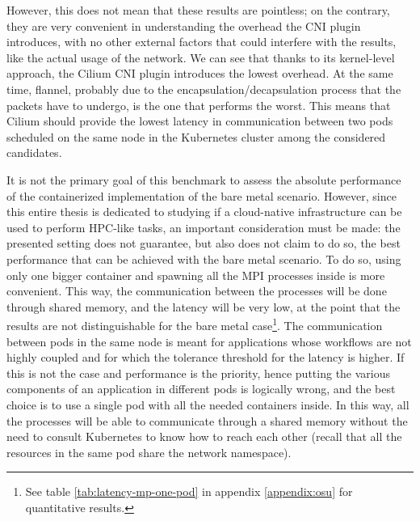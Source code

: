 However, this does not mean that these results are pointless; on the contrary,
they are very convenient in understanding the overhead the CNI plugin
introduces, with no other external factors that could interfere with the
results, like the actual usage of the network.
We can see that thanks to its kernel-level approach, the Cilium CNI plugin
introduces the lowest overhead. At the same time, flannel, probably due to the
encapsulation/decapsulation process that the packets have to undergo, is the one
that performs the worst.
This means that Cilium should provide the lowest latency in communication
between two pods scheduled on the same node in the Kubernetes cluster among the
considered candidates.

It is not the primary goal of this benchmark to assess the absolute performance
of the containerized implementation of the bare metal scenario. However, since
this entire thesis is dedicated to studying if a cloud-native infrastructure can
be used to perform HPC-like tasks, an important consideration must be made: the
presented setting does not guarantee, but also does not claim to do so, the best
performance that can be achieved with the bare metal scenario.
To do so, using only one bigger container and spawning all the MPI processes
inside is more convenient. This way, the communication between the processes
will be done through shared memory, and the latency will be very low, at the
point that the results are not distinguishable for the bare metal
case\footnote{See table
  \ref{tab:latency-mp-one-pod} in appendix \ref{appendix:osu} for
  quantitative results.}.
The communication between pods in the same node is meant for applications whose
workflows are not highly coupled and for which the tolerance threshold for the
latency is higher. If this is not the case and performance is the priority,
hence putting the various components of an application in different pods is
logically wrong, and the best choice is to use a single pod with all the needed
containers inside. In this way, all the processes will be able to communicate
through a shared memory without the need to consult Kubernetes to know how to
reach each other (recall that all the resources in the same pod share the
network namespace).



